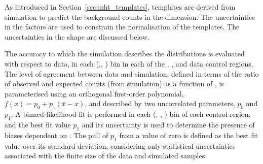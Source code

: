 


As introduced in Section~\ref{sec:mht_templates}, templates are
derived from simulation to predict the background counts in the
\HTmiss dimension. The uncertainties in the \tf factors are used
to constrain the normalisation of the \HTmiss templates. The
uncertainties in the \HTmiss shape are discussed below.


The accuracy to which the simulation describes the \HTmiss
distributions is evaluated with respect to data, in each (\njet,\nb,
\scalht) bin in each of the \mj, \mmj, and \gj data control regions. %
The level of agreement between data and simulation, defined in terms
of the ratio of observed and expected counts (from simulation) as a
function of \HTmiss, is parameterised using an orthogonal first-order
polynomial, $f(x) = p_0 + p_1(\bar{x}-x)$, and described by two
uncorrelated parameters, $p_0$ and $p_1$. A binned likelihood fit is
performed in each (\njet, \nb, \scalht) bin of each control region,
and the best fit value $p_1$ and its uncertainty is used to determine
the presence of biases dependent on \HTmiss. The pull of $p_1$ from a
value of zero is defined as the best fit value over its standard
deviation, considering only statistical uncertainties associated with
the finite size of the data and simulated samples.

